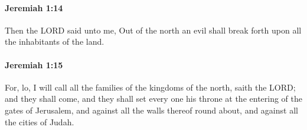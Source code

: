 		\paragraph{Jeremiah 1:14} %
			\label{JEREMIAH-1-14}

			Then the LORD said unto me, Out of the north an evil shall break forth upon all the inhabitants of the land.


		\paragraph{Jeremiah 1:15} %
			\label{JEREMIAH-1-15}

			For, lo, I will call all the families of the kingdoms of the north, saith the LORD; and they shall come, and they shall set every one his throne at the entering of the gates of Jerusalem, and against all the walls thereof round about, and against all the cities of Judah.

